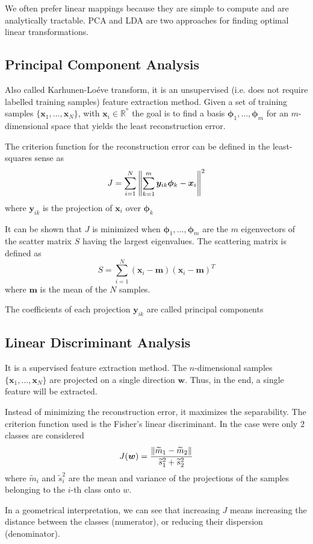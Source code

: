\documentclass[oneside,onecolumn]{report}
\begin{document}
We often prefer linear mappings because they are simple to compute and are analytically tractable.
PCA and LDA are two approaches for finding optimal linear transformations.

\subsection{Principal Component Analysis}
Also called Karhunen-Loéve transform, it is an unsupervised (i.e. does not require labelled training samples) feature extraction method.
Given a set of training samples $\{\bm x_1, \dots, \bm x_N\}$, with $\bm x_i \in \mathbb R^^n$ the goal is to find a basis $\bm \phi_1, \dots, \bm \phi_m$ for an $m$-dimensional space that yields the least reconstruction error.

The criterion function for the reconstruction error can be defined in the least-squares sense as
$$ J = \sum_{i = 1}^N \norm{\sum_{k = 1}^m \bm y_{i k} \bm \phi_k - \bm x_i}^2 $$
where $\bm y_{i k}$ is the projection of $\bm x_i$ over $\bm \phi_k$

It can be shown that $J$ is minimized when $\bm \phi_1, \dots, \bm \phi_m$ are the $m$ eigenvectors of the scatter matrix $S$ having the largest eigenvalues.
The scattering matrix is defined as
$$ S = \sum_{i = 1}^N (\bm x_i - \bm m)(\bm x_i - \bm m)^T $$
where $\bm m$ is the mean of the $N$ samples.

The coefficients of each projection $\bm y_{i k}$ are called principal components


\subsection{Linear Discriminant Analysis}
It is a supervised feature extraction method.
The $n$-dimensional samples $\{\bm x_1, \dots, \bm x_N\}$ are projected on a single direction $\bm w$.
Thus, in the end, a single feature will be extracted.

Instead of minimizing the reconstruction error, it maximizes the separability.
The criterion function used is the Fisher's linear discriminant.
In the case were only 2 classes are considered
$$ J(\bm w) = \frac{\norm{\widetilde m_1 - \widetilde m_2}}{\widetilde s_1^2 + \widetilde s_2^2} $$
where $\widetilde m_i$ and $\widetilde s_i^2$ are the mean and variance of the projections of the samples belonging to the $i$-th class onto $w$.

In a geometrical interpretation, we can see that increasing $J$ means increasing the distance between the classes (numerator), or reducing their dispersion (denominator).
\end{document}

